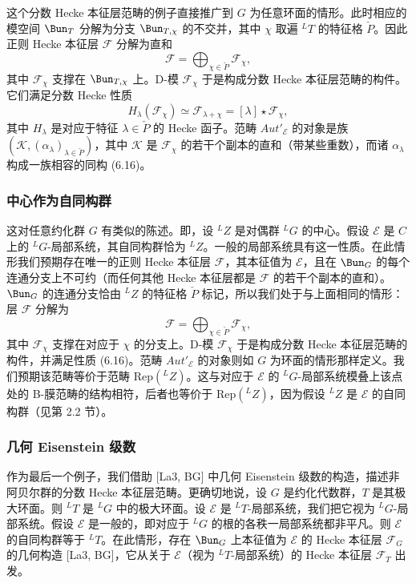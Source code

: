 这个分数 Hecke 本征层范畴的例子直接推广到 $G$ 为任意环面的情形。此时相应的模空间 $\Bun_T$ 分解为分支 $\Bun_{T,\chi}$ 的不交并，其中 $\chi$ 取遍 ${}^LT$ 的特征格 $\check{P}$。因此正则 Hecke 本征层 $\mathcal{F}$ 分解为直和
\begin{equation}\tag{6.15}
\mathcal{F} = \bigoplus_{\chi\in\check{P}}\mathcal{F}_\chi,
\end{equation}
其中 $\mathcal{F}_\chi$ 支撑在 $\Bun_{T,\chi}$ 上。D-模 $\mathcal{F}_\chi$ 于是构成分数 Hecke 本征层范畴的构件。它们满足分数 Hecke 性质
\begin{equation}\tag{6.16}
H_\lambda(\mathcal{F}_\chi)\simeq\mathcal{F}_{\lambda+\chi} = [\lambda]\star\mathcal{F}_\chi,
\end{equation}
其中 $H_\lambda$ 是对应于特征 $\lambda\in\check{P}$ 的 Hecke 函子。范畴 $Aut'_{\mathcal{E}}$ 的对象是族 $(\mathcal{K},(\alpha_\lambda)_{\lambda\in\check{P}})$，其中 $\mathcal{K}$ 是 $\mathcal{F}_\chi$ 的若干个副本的直和（带某些重数），而诸 $\alpha_\lambda$ 构成一族相容的同构 (6.16)。

\subsubsection{中心作为自同构群}

这对任意约化群 $G$ 有类似的陈述。即，设 ${}^LZ$ 是对偶群 ${}^LG$ 的中心。假设 $\mathcal{E}$ 是 $C$ 上的 ${}^LG$-局部系统，其自同构群恰为 ${}^LZ$。一般的局部系统具有这一性质。在此情形我们预期存在唯一的正则 Hecke 本征层 $\mathcal{F}$，其本征值为 $\mathcal{E}$，且在 $\Bun_G$ 的每个连通分支上不可约（而任何其他 Hecke 本征层都是 $\mathcal{F}$ 的若干个副本的直和）。$\Bun_G$ 的连通分支恰由 ${}^LZ$ 的特征格 $\check{P}$ 标记，所以我们处于与上面相同的情形：层 $\mathcal{F}$ 分解为
\[
\mathcal{F} = \bigoplus_{\chi\in\check{P}}\mathcal{F}_\chi,
\]
其中 $\mathcal{F}_\chi$ 支撑在对应于 $\chi$ 的分支上。D-模 $\mathcal{F}_\chi$ 于是构成分数 Hecke 本征层范畴的构件，并满足性质 (6.16)。范畴 $Aut'_{\mathcal{E}}$ 的对象则如 $G$ 为环面的情形那样定义。我们预期该范畴等价于范畴 $\mathrm{Rep}({}^LZ)$。这与对应于 $\mathcal{E}$ 的 ${}^LG$-局部系统模叠上该点处的 B-膜范畴的结构相符，后者也等价于 $\mathrm{Rep}({}^LZ)$，因为假设 ${}^LZ$ 是 $\mathcal{E}$ 的自同构群（见第 2.2 节）。

\subsubsection{几何 Eisenstein 级数}

作为最后一个例子，我们借助 [La3, BG] 中几何 Eisenstein 级数的构造，描述非阿贝尔群的分数 Hecke 本征层范畴。更确切地说，设 $G$ 是约化代数群，$T$ 是其极大环面。则 ${}^LT$ 是 ${}^LG$ 中的极大环面。设 $\mathcal{E}$ 是 ${}^LT$-局部系统，我们把它视为 ${}^LG$-局部系统。假设 $\mathcal{E}$ 是一般的，即对应于 ${}^LG$ 的根的各秩一局部系统都非平凡。则 $\mathcal{E}$ 的自同构群等于 ${}^LT$。在此情形，存在 $\Bun_G$ 上本征值为 $\mathcal{E}$ 的 Hecke 本征层 $\mathcal{F}_G$ 的几何构造 [La3, BG]，它从关于 $\mathcal{E}$（视为 ${}^LT$-局部系统）的 Hecke 本征层 $\mathcal{F}_T$ 出发。

